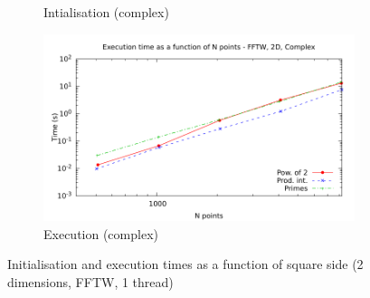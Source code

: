 \documentclass[12pt, a4paper]{article}
\begin{document}
\begin{figure}[H]
\begin{subfigure}{.5\textwidth}
\caption{Intialisation (complex)}
\label{2DFFTWCI}
\end{subfigure}%
\begin{subfigure}{.5\textwidth}
\centering
\includegraphics[width=.9\linewidth]{graphs/2d-fftw-exec-c.pdf}
\caption{Execution (complex)}
\label{2DFFTWC}
\end{subfigure}
\caption{Initialisation and execution times as a function of square side (2 dimensions, FFTW, 1 thread)}
\label{2DFFTW}
\end{figure}
\end{document}
